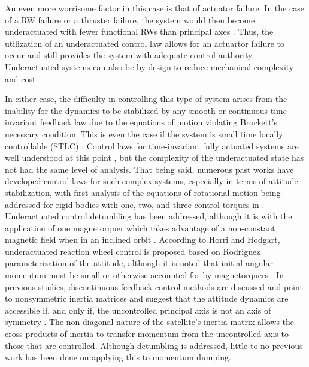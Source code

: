 \documentclass[conf]{new-aiaa}
\begin{document}
An even more worrisome factor in this case is that of actuator failure. In the case of a RW failure or a thruster failure, the system would then become underactuated with fewer functional RWs than principal axes \cite{6,7}. Thus, the utilization of an underactuated control law allows for an actuartor failure to occur and still provides the system with adequate control authority.  Underactuated systems can also be by design to reduce mechanical complexity and cost.

In either case, the difficulty in controlling this type of system arises from the inability for the dynamics to be stabilized by any smooth or continuous time-invariant feedback law due to the equations of motion violating Brockett's necessary condition. This is even the case if the system is small time locally controllable (STLC) \cite{7}. Control laws for time-invariant fully actuated systems are well understood at this point \cite{8}, but the complexity of the underactuated state has not had the same level of analysis. That being said, numerous past works have developed control laws for such complex systems, especially in terms of attitude stabilization, with first analysis of the equations of rotational motion being addressed for rigid bodies with one, two, and three control torques in \cite{9}. Underactuated control detumbling has been addressed, although it is with the application of one magnetorquer which takes advantage of a non-constant magnetic field when in an inclined orbit \cite{10}. According to Horri and Hodgart, underactuated reaction wheel control is proposed based on Rodriguez parameterization of the attitude, although it is noted that initial angular momentum must be small or otherwise accounted for by magnetorquers  \cite{11}. In previous studies, discontinuous feedback control methods are discussed and point to nonsymmetric inertia matrices and suggest that the attitude dynamics are accessible if, and only if, the uncontrolled principal axis is not an axis of symmetry \cite{12,13}. The non-diagonal nature of the satellite’s inertia matrix allows the cross products of inertia to transfer momentum from the uncontrolled axis to those that are controlled. Although detumbling is addressed, little to no previous work has been done on applying this to momentum dumping. 

\end{document}
